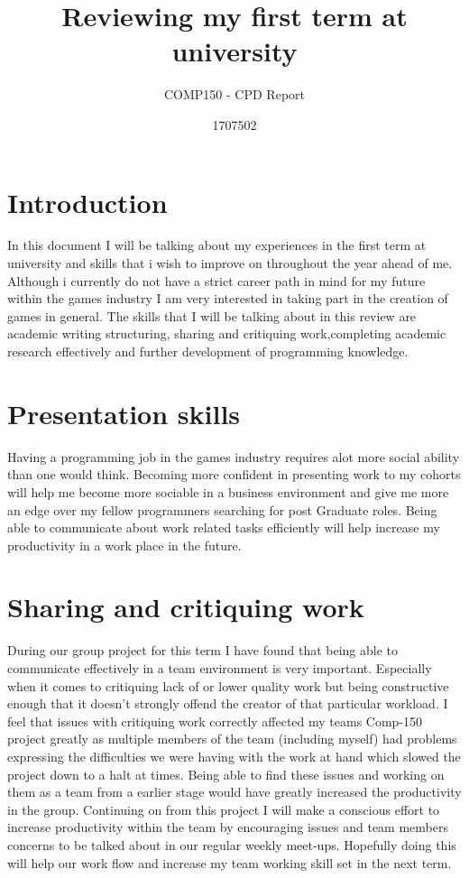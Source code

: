 \documentclass{scrartcl}
\title{Reviewing my first term at university}
\subtitle{COMP150 - CPD Report}
\author{1707502}
\begin{document}
\maketitle

\section{Introduction}
In this document I will be talking about my experiences in the first term at university and skills that i wish to improve on throughout the year ahead of me.
Although i currently do not have a strict career path in mind for my future within the games industry I am very interested in taking part in the creation of games in general. The skills that I will be talking about in this review are academic writing structuring, sharing and critiquing work,completing academic research effectively and further development of programming knowledge.   

\section{Presentation skills}
Having a programming job in the games industry requires alot more social ability than one would think. Becoming more confident in presenting work to my cohorts will help me become more sociable in a business environment and give me more an edge over my fellow programmers searching for post Graduate roles. Being able to communicate about work related tasks efficiently will help increase my productivity in a work place in the future.


\section{Sharing and critiquing work}

During our group project for this term I have found that being able to communicate effectively in a team environment is very important. Especially when it comes to critiquing lack of or lower quality work but being constructive enough that it doesn't strongly offend the creator of that particular workload. I feel that issues with critiquing work correctly affected my teams Comp-150 project greatly as multiple members of the team (including myself) had problems expressing the difficulties we were having with the work at hand which slowed the project down to a halt at times. Being able to find these issues and working on them as a team from a earlier stage would have greatly increased the productivity in the group. Continuing on from this project I will make a conscious effort to increase productivity within the team by encouraging issues and team members concerns to be talked about in our regular weekly meet-ups. Hopefully doing this will help our work flow and increase my team working skill set in the next term. 
\end{document}
